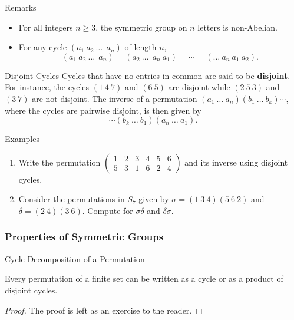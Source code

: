 \documentclass{beamer}
\begin{document}
\begin{frame}{Remarks}
\begin{itemize}
\item For all integers $n \geq 3$, the symmetric group on $n$ letters is non-Abelian.
\item For any cycle $(a_1 \ a_2 \ \dots \ \ a_n )$ of length $n$, 
\[
(a_1 \ a_2 \ \dots \ \ a_n ) = (a_2 \ \dots \ \ a_n \ a_1 ) = \cdots = (\dots \ a_n \ a_1 \ a_2).
\]
\end{itemize}    
\end{frame}

\begin{frame}{Disjoint Cycles}
\justifying
Cycles that have no entries in common are said to be \textbf{disjoint}.    
\newline\newline
\pause
For instance, the cycles $(1 \ 4 \ 7)$ and $(6 \ 5)$ are disjoint while $(2 \ 5 \ 3)$ and $(3 \ 7)$ are not disjoint.
\newline\newline
\pause
The inverse of a permutation $(a_1 \ \dots \ a_n)(b_1 \ \dots \ b_k)\cdots$, where the cycles are pairwise disjoint, is then given by
\[
\cdots(b_k \ \dots \ b_1)(a_n \ \dots \ a_1).
\]
\end{frame}

\begin{frame}{Examples}
\begin{enumerate}
\item Write the permutation $\begin{pmatrix} 1 & 2 & 3 & 4 & 5 & 6 \\ 5 & 3 & 1 & 6 & 2 & 4 \end{pmatrix}$ and its inverse using disjoint cycles.
\item Consider the permutations in $S_7$ given by $\sigma = (1 \ 3 \ 4)(5 \ 6 \ 2)$ and $\delta = (2 \ 4)(3 \ 6)$. Compute for $\sigma\delta$ and $\delta\sigma$.
\end{enumerate}    
\end{frame}

\subsubsection{Properties of Symmetric Groups}

\begin{frame}{Cycle Decomposition of a Permutation}
\begin{theorem}
Every permutation of a finite set can be written as a cycle or as a product of disjoint cycles.
\end{theorem}
\pause
\begin{proof}
The proof is left as an exercise to the reader.    
\end{proof}
\end{frame}
\end{document}
